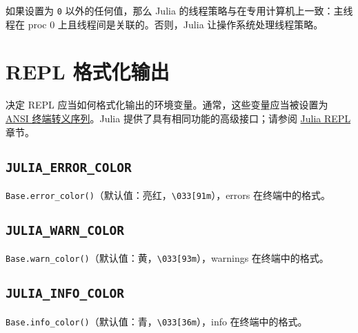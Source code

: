 如果设置为 \texttt{0} 以外的任何值，那么 Julia 的线程策略与在专用计算机上一致：主线程在 proc 0 上且线程间是关联的。否则，Julia 让操作系统处理线程策略。



\hypertarget{16378430867132816632}{}


\section{REPL 格式化输出}



决定 REPL 应当如何格式化输出的环境变量。通常，这些变量应当被设置为 \href{http://ascii-table.com/ansi-escape-sequences.php}{ANSI 终端转义序列}。Julia 提供了具有相同功能的高级接口；请参阅 \hyperlink{10670790884919535588}{Julia REPL} 章节。



\hypertarget{13891100922495428417}{}


\subsection{\texttt{JULIA\_ERROR\_COLOR}}



\texttt{Base.error\_color()}（默认值：亮红，\texttt{{\textquotedbl}{\textbackslash}033[91m{\textquotedbl}}），errors 在终端中的格式。



\hypertarget{17711733982596187514}{}


\subsection{\texttt{JULIA\_WARN\_COLOR}}



\texttt{Base.warn\_color()}（默认值：黄，\texttt{{\textquotedbl}{\textbackslash}033[93m{\textquotedbl}}），warnings 在终端中的格式。



\hypertarget{10994657891761481518}{}


\subsection{\texttt{JULIA\_INFO\_COLOR}}



\texttt{Base.info\_color()}（默认值：青，\texttt{{\textquotedbl}{\textbackslash}033[36m{\textquotedbl}}），info 在终端中的格式。



